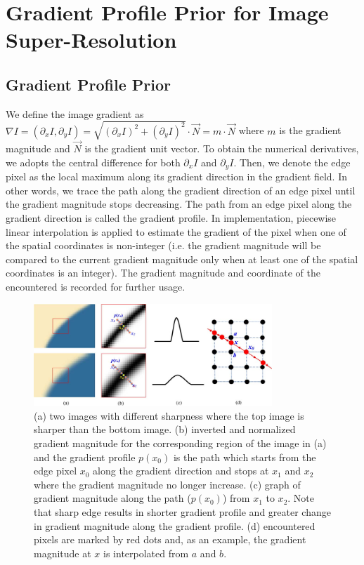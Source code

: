 \documentclass[a4paper,11pt]{article}
\begin{document}
\section{Gradient Profile Prior for Image Super-Resolution}

\subsection{Gradient Profile Prior}
\label{Gradient Profile Prior}

We define the image gradient as $\nabla I = (\partial_x I, \partial_y I) = \sqrt{(\partial_x I)^2 + (\partial_y I)^2} \cdot \vec{N} = m \cdot \vec{N} $ where $m$ is the gradient magnitude and $\vec{N}$ is the gradient unit vector. To obtain the numerical derivatives, we adopts the central difference for both $\partial_x I$ and $\partial_y I$. Then, we denote the edge pixel as the local maximum along its gradient direction in the gradient field. In other words, we trace the path along the gradient direction of an edge pixel until the gradient magnitude stops decreasing. The path from an edge pixel along the gradient direction is called the gradient profile. In implementation, piecewise linear interpolation is applied to estimate the gradient of the pixel when one of the spatial coordinates is non-integer (i.e. the gradient magnitude will be compared to the current gradient magnitude only when at least one of the spatial coordinates is an integer). The gradient magnitude and coordinate of the encountered is recorded for further usage.

\begin{figure}[H]
	\centering
	\includegraphics[width=0.8\textwidth]{Gradient-profile-a-Two-edges-with-different-sharpness-b-Gradient-maps-normalized.png}
	\caption{(a) two images with different sharpness where the top image is sharper than the bottom image. (b) inverted and normalized gradient magnitude for the corresponding region of the image in (a) and the gradient profile $p(x_0)$ is the path which starts from the edge pixel $x_0$ along the gradient direction and stops at $x_1$ and $x_2$ where the gradient magnitude no longer increase. (c) graph of gradient magnitude along the path ($p(x_0)$) from  $x_1$ to $x_2$. Note that sharp edge results in shorter gradient profile and greater change in gradient magnitude along the gradient profile. (d) encountered pixels are marked by red dots and, as an example, the gradient magnitude at $x$ is interpolated from $a$ and $b$.}
	\label{fig:gp}
\end{figure}
\end{document}
